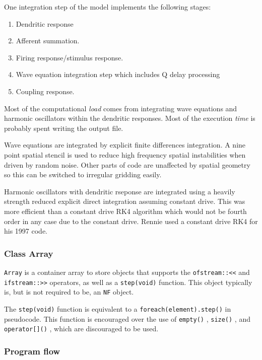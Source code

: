\documentclass[12pt,a4paper]{article}
\newcommand{\type}[1]{ {\small\small\tt #1} }
\begin{document}
One integration step of the model implements the following stages: 

\begin{enumerate}
	\item  Dendritic response
	\item  Afferent summation. 
	\item  Firing response/stimulus response. 
	\item  Wave equation integration step which includes Q delay processing 
	\item  Coupling response.
\end{enumerate}

Most of the computational {\em load} comes from integrating wave equations and harmonic oscillators within the dendritic responses. Most of the execution {\em time} is probably spent writing the output file.

Wave equations are integrated by explicit finite differences integration. A nine point spatial stencil is used to reduce high frequency spatial instabilities when driven by random noise. Other parts of code are unaffected by spatial geometry so this can be switched to irregular gridding easily.

Harmonic oscillators with dendritic rseponse are integrated using a heavily strength reduced explicit direct integration assuming constant drive. This was more efficient than a constant drive RK4 algorithm which would not be fourth order in any case due to the constant drive. Rennie used a constant drive RK4 for his 1997 code.

\subsubsection{Class Array}
\label{sec:array}

\type{Array} is a container array to store objects that supports the \type{ofstream::<<} and \type{ifstream::>>} operators, as well as a \type{step(void)} function. This object typically is, but is not required to be, an \type{NF} object.

The \type{step(void)} function is equivalent to a \type{foreach(element).step()} in pseudocode. This function is encouraged over the use of \type{empty()}, \type{size()}, and \type{operator[]()}, which are discouraged to be used.

\subsubsection{Program flow}
\end{document}
